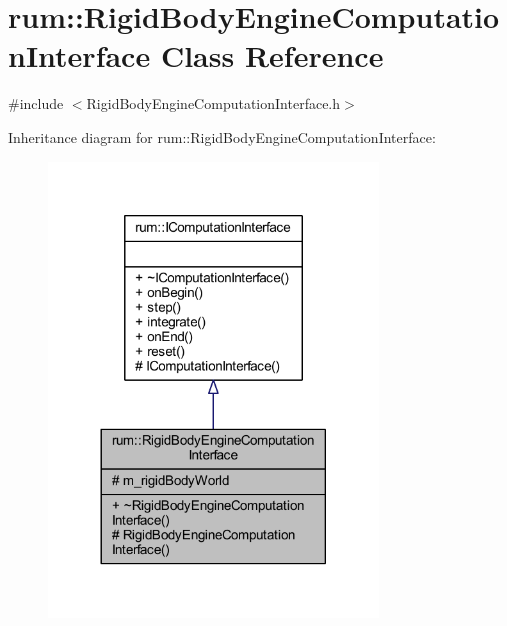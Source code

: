 \hypertarget{classrum_1_1_rigid_body_engine_computation_interface}{}\section{rum\+:\+:Rigid\+Body\+Engine\+Computation\+Interface Class Reference}
\label{classrum_1_1_rigid_body_engine_computation_interface}


{\ttfamily \#include $<$Rigid\+Body\+Engine\+Computation\+Interface.\+h$>$}



Inheritance diagram for rum\+:\+:Rigid\+Body\+Engine\+Computation\+Interface\+:\nopagebreak
\begin{figure}[H]
\begin{center}
\leavevmode
\includegraphics[width=248pt]{classrum_1_1_rigid_body_engine_computation_interface__inherit__graph}
\end{center}
\end{figure}


